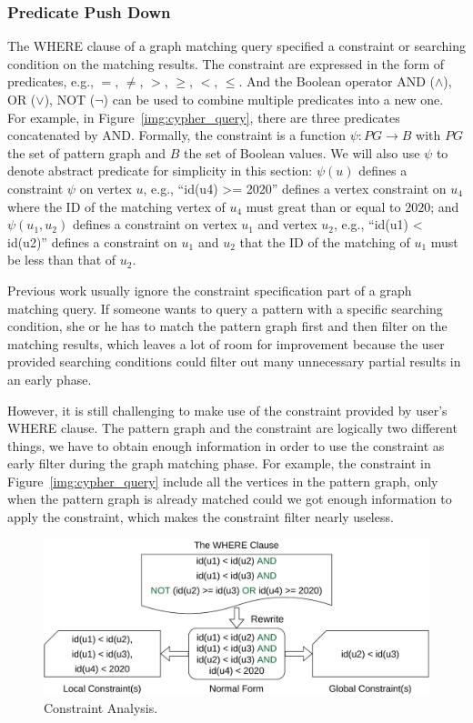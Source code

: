 \subsubsection{Predicate Push Down}
The WHERE clause of a graph matching query specified a constraint or searching condition on the matching results.
The constraint are expressed in the form of predicates, e.g., $=$, $\neq$, $>$, $\ge$, $<$, $\le$.
And the Boolean operator AND ($\land$), OR ($\lor$), NOT ($\lnot$) can be used to combine multiple predicates into a new one.
For example, in Figure~\ref{img:cypher_query}, there are three predicates concatenated by AND\@.
Formally, the constraint is a function $\psi: PG \rightarrow B$ with $PG$ the set of pattern graph and $B$ the set of Boolean values.
We will also use $\psi$ to denote abstract predicate for simplicity in this section:
$\psi(u)$ defines a constraint $\psi$ on vertex $u$, e.g., ``{id(u4) >= 2020}'' defines a vertex constraint on $u_4$ where the ID of the matching vertex of $u_4$ must great than or equal to $2020$;
and $\psi(u_1, u_2)$ defines a constraint on vertex $u_1$ and vertex $u_2$,
e.g., ``{id(u1) < id(u2)}'' defines a constraint on $u_1$ and $u_2$ that the ID of the matching of $u_1$ must be less than that of $u_2$.

Previous work usually ignore the constraint specification part of a graph matching query.
If someone wants to query a pattern with a specific searching condition,
she or he has to match the pattern graph first and then filter on the matching results,
which leaves a lot of room for improvement because the user provided searching conditions could filter out many unnecessary
partial results in an early phase.

However, it is still challenging to make use of the constraint provided by user's WHERE clause.
The pattern graph and the constraint are logically two different things,
we have to obtain enough information in order to use the constraint as early filter during the graph matching phase.
For example, the constraint in Figure~\ref{img:cypher_query} include all the vertices in the pattern graph,
only when the pattern graph is already matched could we got enough information to apply the constraint,
which makes the constraint filter nearly useless.

\begin{figure}[ht]
  \centering
  \includegraphics[width=.45\textwidth]{img/constraints.pdf}
  \caption{Constraint Analysis.}\label{img:constraints}
\end{figure}

